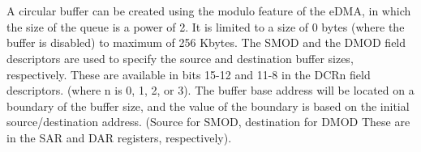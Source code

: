 \section{}

A circular buffer can be created using the modulo feature of the eDMA, in which
the size of the queue is a power of 2. It is limited to a size of 0 bytes
(where the buffer is disabled) to maximum of 256 Kbytes. The SMOD and the DMOD 
field descriptors are used to specify the source and destination buffer sizes,
respectively. These are available in bits 15-12 and 11-8 in the DCRn field
descriptors. (where n is 0, 1, 2, or 3). The buffer base address will be located
on a boundary of the buffer size, and the value of the boundary is based on the
initial source/destination address. (Source for SMOD, destination for DMOD These
are in the SAR and DAR registers, respectively).
